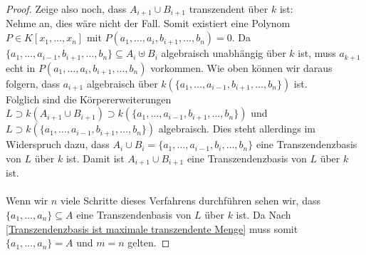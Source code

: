 \documentclass[10pt,a4paper]{report}
\begin{document}
\begin{proof}
Zeige also noch, dass $A_{i+1} \cup B_{i+1}$ transzendent über $k$ ist:\\
Nehme an, dies wäre nicht der Fall. Somit existiert eine Polynom $P \in K[x_1, \dots ,x_n]$ mit $P(a_1, \dots , a_i, b_{i+1}, \dots , b_n) = 0$. Da $\lbrace a_1, \dots , a_{i-1}, b_{i+1}, \dots , b_n \rbrace \subseteq A_i \uplus B_i$ algebraisch unabhängig über $k$ ist, muss $a_{k+1}$ echt in $P(a_1, \dots , a_i, b_{i+1}, \dots , b_n)$ vorkommen. Wie oben können wir daraus folgern, dass $a_{i+1}$ algebraisch über $k(\lbrace a_1, \dots , a_{i-1}, b_{i+1}, \dots , b_n \rbrace)$ ist.\\
Folglich sind die Körpererweiterungen $L\supset k(A_{i+1} \cup B_{i+1}) \supset k(\lbrace a_1, \dots , a_{i-1}, b_{i+1}, \dots , b_n \rbrace)$ und $L\supset k(\lbrace a_1, \dots , a_{i-1}, b_{i+1}, \dots , b_n \rbrace)$ algebraisch. Dies steht allerdings im Widerspruch dazu, dass $A_i \cup B_i = \lbrace a_1, \dots , a_{i-1}, b_{i}, \dots , b_n \rbrace$ eine Transzendenzbasis von $L$ über $k$ ist. Damit ist $A_{i+1} \cup B_{i+1}$ eine Transzendenzbasis von $L$ über $k$ ist.\\
\ \\
Wenn wir $n$ viele Schritte dieses Verfahrens durchführen sehen wir, dass $\lbrace a_1, \dots , a_n \rbrace \subseteq A$ eine Transzendenbasis von $L$ über $k$ ist. Da Nach \cref{Transzendenzbasis ist maximale transzendente Menge} muss somit $\lbrace a_1, \dots , a_n \rbrace = A$ und $m = n$ gelten.

\end{proof}
\end{document}
